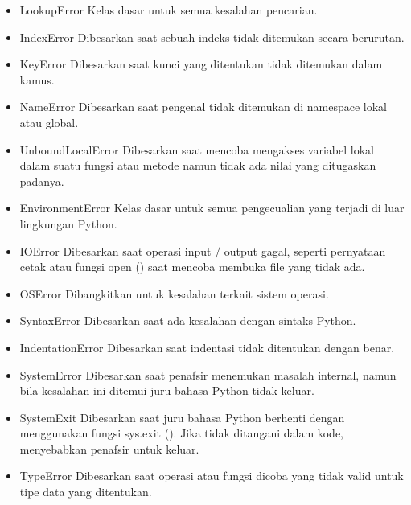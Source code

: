 \begin{enumerate}
\begin{itemize}
        \item LookupError
        Kelas dasar untuk semua kesalahan pencarian.

        \item IndexError
        Dibesarkan saat sebuah indeks tidak ditemukan secara berurutan.

        \item KeyError
        Dibesarkan saat kunci yang ditentukan tidak ditemukan dalam kamus.

        \item NameError
        Dibesarkan saat pengenal tidak ditemukan di namespace lokal atau global.

        \item UnboundLocalError
        Dibesarkan saat mencoba mengakses variabel lokal dalam suatu fungsi atau metode namun tidak ada nilai yang ditugaskan padanya.

        \item EnvironmentError
        Kelas dasar untuk semua pengecualian yang terjadi di luar lingkungan Python.

        \item IOError
        Dibesarkan saat operasi input / output gagal, seperti pernyataan cetak atau fungsi open () saat mencoba membuka file yang tidak ada.

        \item OSError
        Dibangkitkan untuk kesalahan terkait sistem operasi.

        \item SyntaxError
        Dibesarkan saat ada kesalahan dengan sintaks Python.

        \item IndentationError
        Dibesarkan saat indentasi tidak ditentukan dengan benar.

        \item SystemError
        Dibesarkan saat penafsir menemukan masalah internal, namun bila kesalahan ini ditemui juru bahasa Python tidak keluar.

        \item SystemExit
        Dibesarkan saat juru bahasa Python berhenti dengan menggunakan fungsi sys.exit (). Jika tidak ditangani dalam kode, menyebabkan penafsir untuk keluar.

        \item TypeError
        Dibesarkan saat operasi atau fungsi dicoba yang tidak valid untuk tipe data yang ditentukan.


\end{itemize}
\end{enumerate}
